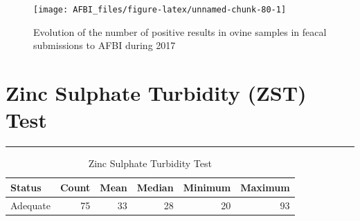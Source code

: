 \documentclass[]{book}
\begin{document}
\begin{figure}

{\centering \texttt{[image: AFBI\_files/figure-latex/unnamed-chunk-80-1]} 

}

\caption{Evolution of the number of positive results in ovine  samples in feacal submissions to AFBI during 2017}\label{fig:unnamed-chunk-80}
\end{figure}

\chapter{Zinc Sulphate Turbidity (ZST)
Test}\label{zinc-sulphate-turbidity-zst-test}

\begin{center}\rule{0.5\linewidth}{\linethickness}\end{center}

\begin{table}

\caption{\label{tab:unnamed-chunk-84}Zinc Sulphate Turbidity Test}
\centering
\begin{tabular}[t]{l|r|r|r|r|r}
\hline
Status & Count & Mean & Median & Minimum & Maximum\\
\hline
Adequate & 75 & 33 & 28 & 20 & 93\\
\hline
\end{tabular}
\end{table}


\end{document}
